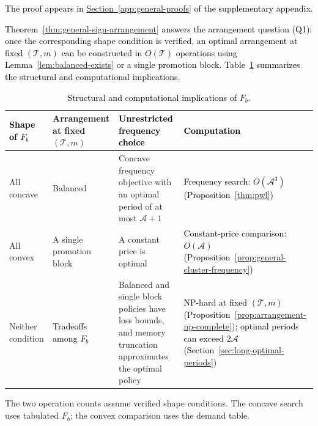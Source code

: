 \textcolor{black}{The proof appears in \hyperref[app:arrangement-theorem-proof]{Section~\ref*{app:general-proofs}} of the supplementary appendix.}

\textcolor{black}{Theorem~\ref{thm:general-sign-arrangement} answers the arrangement question (Q1): once the corresponding shape condition is verified, an optimal arrangement at fixed \((\mathcal T,m)\) can be constructed in \(O(\mathcal T)\) operations using Lemma~\ref{lem:balanced-exists} or a single promotion block. Table~\ref{tab:result-map} summarizes the structural and computational implications.}
\begin{table}[ht]
\centering\small
\caption{\textcolor{black}{Structural and computational implications of \(F_b\).}}
\label{tab:result-map}
\begin{tabularx}{\textwidth}{@{}l>{\raggedright\arraybackslash}X>{\raggedright\arraybackslash}X>{\raggedright\arraybackslash}X@{}}
\toprule
\textcolor{black}{Shape of \(F_b\)} & Arrangement at fixed \((\mathcal T,m)\) & \textcolor{black}{Unrestricted frequency choice} & \textcolor{black}{Computation} \\
\midrule
All concave & Balanced & Concave frequency objective with an optimal period of at most \(\mathcal A+1\) & \textcolor{black}{Frequency search: \(O(\mathcal A^3)\) (Proposition~\ref{thm:pwl})} \\[3pt]
All convex & A single promotion block & A constant price is optimal & \textcolor{black}{Constant-price comparison: \(O(\mathcal A)\) (Proposition~\ref{prop:general-cluster-frequency})} \\[3pt]
Neither condition & \textcolor{black}{Tradeoffs among \(F_b\)} & Balanced and single block policies have loss bounds, and memory truncation approximates the optimal policy & \textcolor{black}{NP-hard at fixed \((\mathcal T,m)\) (Proposition~\ref{prop:arrangement-np-complete}); optimal periods can exceed \(2\mathcal A\) (Section~\ref{sec:long-optimal-periods})} \\
\bottomrule
\end{tabularx}
\par\smallskip
{\footnotesize\raggedright\color{black}The two operation counts assume verified shape conditions. The concave search uses tabulated \(F_b\); the convex comparison uses the demand table.\par}
\end{table}

